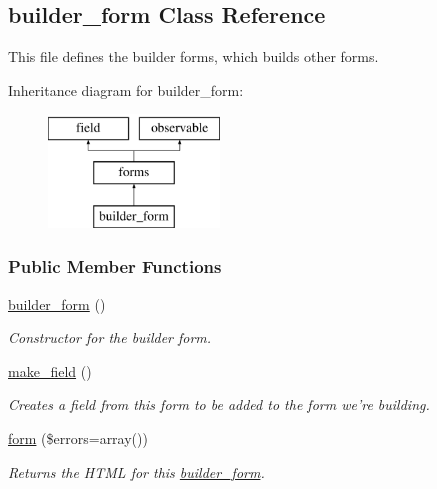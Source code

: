 \hypertarget{classbuilder__form}{\subsection{builder\-\_\-form Class Reference}
\label{classbuilder__form}
}


This file defines the builder forms, which builds other forms.  


Inheritance diagram for builder\-\_\-form\-:\begin{figure}[H]
\begin{center}
\leavevmode
\includegraphics[height=3.000000cm]{classbuilder__form}
\end{center}
\end{figure}
\subsubsection*{Public Member Functions}
\begin{DoxyCompactItemize}
\item 
\hypertarget{classbuilder__form_a3ffef39ae7e16de827d3a1467b8085a2}{\hyperlink{classbuilder__form_a3ffef39ae7e16de827d3a1467b8085a2}{builder\-\_\-form} ()}\label{classbuilder__form_a3ffef39ae7e16de827d3a1467b8085a2}

\begin{DoxyCompactList}\small\item\em Constructor for the builder form. \end{DoxyCompactList}\item 
\hyperlink{classbuilder__form_a6408926fe73438032738d8a0095acf8d}{make\-\_\-field} ()
\begin{DoxyCompactList}\small\item\em Creates a field from this form to be added to the form we're building. \end{DoxyCompactList}\item 
\hyperlink{classbuilder__form_a13989dd465615470a1145b401c672fcb}{form} (\$errors=array())
\begin{DoxyCompactList}\small\item\em Returns the H\-T\-M\-L for this \hyperlink{classbuilder__form}{builder\-\_\-form}. \end{DoxyCompactList}\end{DoxyCompactItemize}
